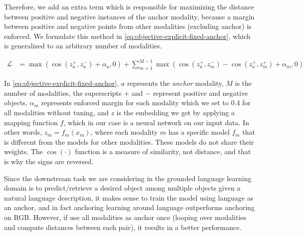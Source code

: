 \documentclass[10pt]{article} %
\begin{document}
Therefore, we add an extra term which is responsible for maximizing the distance between positive and negative instances of the anchor modality, because a margin between positive and negative points from other modalities (excluding anchor) is enforced. 
We formulate this method in \cref{eq:objective-explicit-fixed-anchor}, which is generalized to an arbitrary number of modalities.

\begin{equation}
\label{eq:objective-explicit-fixed-anchor}
\begin{split}
    \mathcal{L}  %
    &= \max(\cos(z_{a}^{+}, z_{a}^{-}) + \alpha_a, 0) + \sum_{m=1}^{M-1} \max \left(\cos(z_{a}^{+} ,z_{m}^{-}) - \cos(z_{a}^{+}, z_{m}^{+}) + \alpha_m, 0 \right) 
\end{split}
\end{equation}


In \cref{eq:objective-explicit-fixed-anchor}, $a$ represents the \textit{anchor} modality, $M$ is the number of modalities, the superscripts $+$ and $-$ represent positive and negative objects, $\alpha_m$ represents enforced margin for each modality which we set to 0.4 for all modalities without tuning, and $z$ is the embedding we get by applying a mapping function $f$, which in our case is a neural network on our input data.
In other words, $z_m = f_m(x_m)$, where each modality $m$ has a specific model $f_m$ that is different from the models for other modalities. These models do not share their weights. The $\cos(\cdot)$ function is a measure of similarity, not distance, and that is why the signs are reversed. 

Since the downstream task we are considering in the grounded language learning domain is to predict/retrieve a desired object among multiple objects given a natural language description, it makes sense to train the model using language as an anchor, and in fact anchoring learning around language outperforms anchoring on RGB. However, if use all modalities as anchor once (looping over modalities and compute distances between each pair), it results in a better performance.


\end{document}
